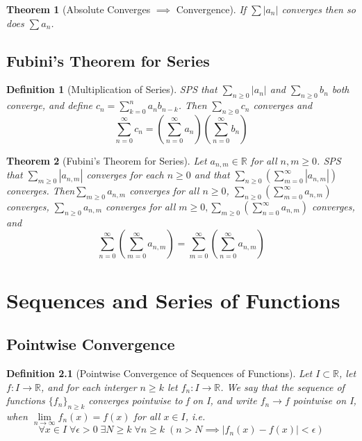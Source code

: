 \documentclass[11pt, oneside]{book}
\theoremstyle{break}
\newtheorem{thm}{Theorem}[section]
\newtheorem{defn}{Definition}[section]
\newcommand{\bb}[1]{\mathbb{#1}}		%
\begin{document}
\begin{thm}[Absolute Converges $\implies$ Convergence]
	If $\sum |a_n|$ converges then so does $\sum a_n$.
\end{thm}


\section{Fubini's Theorem for Series}\label{fubinithm_series}
\begin{defn}[Multiplication of Series]\label{series_multiplication}
	SPS that $\sum_{n \geq 0} |a_n|$ and $\sum_{n \geq 0} b_n$ both converge, and define $c_n = \sum\limits_{k = 0}^{n} a_n b_{n - k}$. Then $\sum_{n \geq 0} c_n$ converges and
	\[
		\sum_{n = 0}^{\infty} c_n = \left( \sum_{n = 0}^{\infty} a_n \right) \left(\sum_{n = 0}^{\infty} b_n \right)
	\]
\end{defn}

\begin{thm}[Fubini's Theorem for Series]
	Let $a_{n, m} \in \bb{R}$ for all $n, m \geq 0$. SPS that $\sum_{m \geq 0} |a_{n, m}|$ converges for each $n \geq 0$ and that $\sum\limits_{n \geq 0} \left(\sum\limits_{m = 0}^{\infty} |a_{n, m}| \right)$ converges. Then$\sum_{m \geq 0} a_{n, m}$ converges for all $n \geq 0$, $\sum\limits_{n \geq 0} \left( \sum\limits_{m = 0}^{\infty} a_{n, m} \right)$ converges, $\sum_{n \geq 0} a_{n, m}$ converges for all $m \geq 0, \sum\limits_{m \geq 0} \left(\sum\limits_{n = 0}^{\infty} a_{n, m} \right)$ converges, and
	\[
		\sum_{n = 0}^{\infty} \left(\sum_{m = 0}^{\infty} a_{n, m} \right) = \sum_{m = 0}^{\infty} \left(\sum_{n = 0}^{\infty} a_{n, m} \right)
	\]
\end{thm}

\chapter{Sequences and Series of Functions}

\section{Pointwise Convergence}

\begin{defn}[Pointwise Convergence of Sequences of Functions]
	Let $I \subset \bb{R}$, let $f: I \to \bb{R}$, and for each interger $n \geq k$ let $f_n : I \to \bb{R}$. We say that the sequence of functions $\{f_n\}_{n \geq k}$ converges pointwise to f on I, and write $f_n \to f$ pointwise on I, when $\lim\limits_{n \to \infty} f_n(x) = f(x)$ for all $x \in I$, i.e.
	\[
		\forall x \in I \; \forall \epsilon > 0 \; \exists N \geq k \; \forall n \geq k \; (n > N \implies |f_n(x) - f(x)| < \epsilon)
	\]
\end{defn}
\end{document}
